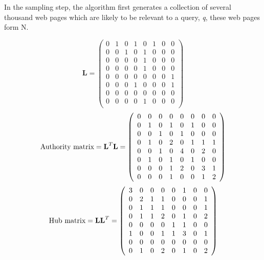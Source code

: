 \documentclass[11pt]{report}
\begin{document}
In the sampling step, the algorithm first generates a collection of several thousand web pages which are likely to be relevant to a query, \textit{q}, these web pages form N.

\begin{equation}
\textbf{L}=\left(
\begin{array}{cccccccc}
0 & 1 & 0 & 1 & 0 & 1 & 0 & 0 \\
0 & 0 & 1 & 0 & 1 & 0 & 0 & 0 \\
0 & 0 & 0 & 0 & 1 & 0 & 0 & 0 \\
0 & 0 & 0 & 0 & 1 & 0 & 0 & 0 \\
0 & 0 & 0 & 0 & 0 & 0 & 0 & 1 \\
0 & 0 & 0 & 1 & 0 & 0 & 0 & 1 \\
0 & 0 & 0 & 0 & 0 & 0 & 0 & 0 \\
0 & 0 & 0 & 0 & 1 & 0 & 0 & 0 \\
\end{array}
\right)
\end{equation}
\begin{equation}
\textnormal{Authority matrix} = \textbf{L}^T\textbf{L}=\left(
\begin{array}{cccccccc}
0 & 0 & 0 & 0 & 0 & 0 & 0 & 0 \\
0 & 1 & 0 & 1 & 0 & 1 & 0 & 0 \\
0 & 0 & 1 & 0 & 1 & 0 & 0 & 0 \\
0 & 1 & 0 & 2 & 0 & 1 & 1 & 1 \\
0 & 0 & 1 & 0 & 4 & 0 & 2 & 0 \\
0 & 1 & 0 & 1 & 0 & 1 & 0 & 0 \\
0 & 0 & 0 & 1 & 2 & 0 & 3 & 1 \\
0 & 0 & 0 & 1 & 0 & 0 & 1 & 2 \\
\end{array}
\right)
\end{equation}
\begin{equation}
\textnormal{Hub matrix} = \textbf{LL}^T=\left(
\begin{array}{cccccccc}
3 & 0 & 0 & 0 & 0 & 1 & 0 & 0 \\
0 & 2 & 1 & 1 & 0 & 0 & 0 & 1 \\
0 & 1 & 1 & 1 & 0 & 0 & 0 & 1 \\
0 & 1 & 1 & 2 & 0 & 1 & 0 & 2 \\
0 & 0 & 0 & 0 & 1 & 1 & 0 & 0 \\
1 & 0 & 0 & 1 & 1 & 3 & 0 & 1 \\
0 & 0 & 0 & 0 & 0 & 0 & 0 & 0 \\
0 & 1 & 0 & 2 & 0 & 1 & 0 & 2 \\
\end{array}
\right)
\end{equation}
\end{document}
